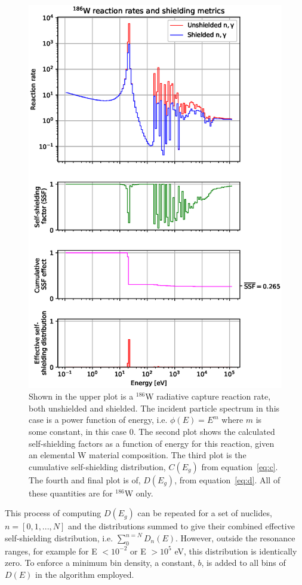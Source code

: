 \begin{figure}
  \centering
  \includegraphics[width=0.8\linewidth]{W186_gamma}
  \caption[Step-wise functions for calculating the effective self-shielding distribution.]{Shown in the upper plot is a $^{186}$W radiative capture reaction rate, both unshielded and shielded. The incident particle spectrum in this case is a power function of energy, i.e. $\phi(E) = E^{m}$ where $m$ is some constant, in this case 0. The second plot shows the calculated self-shielding factors as a function of energy for this reaction, given an elemental W material composition. The third plot is the cumulative self-shielding distribution, $C(E_{g})$ from equation~\ref{eq:c}. The fourth and final plot is of, $D(E_{g})$, from equation~\ref{eq:d}. All of these quantities are for $^{186}$W only.}
  \label{fig:w_cross_section}
\end{figure}

This process of computing $D(E_{g})$ can be repeated for a set of nuclides, $n = [0, 1, ..., N]$ and the distributions summed to give their combined effective self-shielding distribution, i.e. $\sum_{0}^{n=N}D_{n}(E)$. However, outside the resonance ranges, for example for E $< 10^{-2}$ or E $> 10^{5}$ eV, this distribution is identically zero. To enforce a minimum bin density, a constant, $b$, is added to all bins of $D(E)$ in the algorithm employed. 


